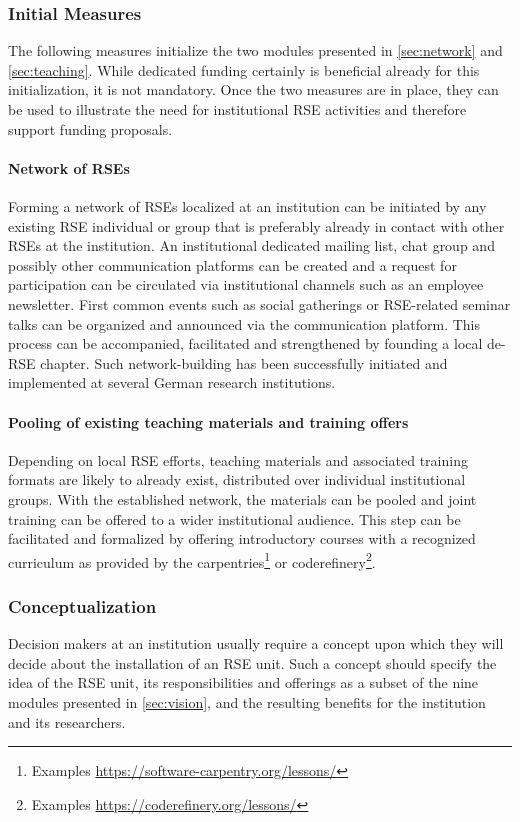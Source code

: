 \documentclass[a4paper]{article}
\begin{document}
\subsubsection{Initial Measures}
The following measures initialize the two modules presented in \autoref{sec:network} and \autoref{sec:teaching}.
While dedicated funding certainly is beneficial already for this initialization, it is not mandatory.
Once the two measures are in place, they can be used to illustrate the need for institutional RSE activities and therefore support funding proposals.

\paragraph{Network of RSEs}
Forming a network of RSEs localized at an institution can be initiated by any existing RSE individual or group that is preferably already in contact with other RSEs at the institution.
An institutional dedicated mailing list, chat group and possibly other communication platforms can be created and a request for participation can be circulated via institutional channels such as an employee newsletter.
First common events such as social gatherings or RSE-related seminar talks can be organized and announced via the communication platform.
This process can be accompanied, facilitated and strengthened by founding a local de-RSE chapter.
Such network-building has been successfully initiated and implemented at several German research institutions.

\paragraph{Pooling of existing teaching materials and training offers}
Depending on local RSE efforts, teaching materials and associated training formats are likely to already exist,
distributed over individual institutional groups.
With the established network, the materials can be pooled and joint training can be offered to a wider institutional audience.
This step can be facilitated and formalized by offering introductory courses with a recognized curriculum as provided by the carpentries\footnote{Examples \url{https://software-carpentry.org/lessons/}}
or coderefinery\footnote{Examples \url{https://coderefinery.org/lessons/}}.

\subsubsection{Conceptualization}
Decision makers at an institution usually require a concept upon which they will decide about the installation of an RSE unit.
Such a concept should specify the idea of the RSE unit, its responsibilities and offerings as a subset of the nine modules presented in \autoref{sec:vision}, and the resulting benefits for the institution and its researchers.
\end{document}
